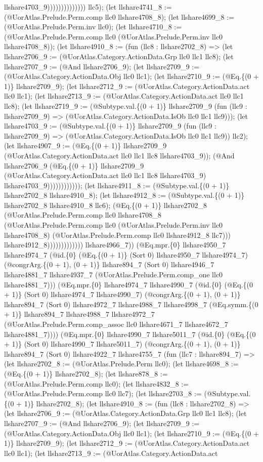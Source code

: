 \documentclass[11pt]{article}
\begin{document}
llshare4703\_9)))))))))))))) llc5); (let llshare4741\_8 := (@UorAtlas.Prelude.Perm.comp llc0 llshare4708\_8); (let llshare4699\_8 := (@UorAtlas.Prelude.Perm.inv llc0); (let llshare4710\_8 := (@UorAtlas.Prelude.Perm.comp llc0 (@UorAtlas.Prelude.Perm.inv llc0 llshare4708\_8)); (let llshare4910\_8 := (fun (llc8 : llshare2702\_8) => (let llshare2706\_9 := (@UorAtlas.Category.ActionData.Grp llc0 llc1 llc8); (let llshare2707\_9 := (@And llshare2706\_9); (let llshare2709\_9 := (@UorAtlas.Category.ActionData.Obj llc0 llc1); (let llshare2710\_9 := (@Eq.\{(0 + 1)\} llshare2709\_9); (let llshare2712\_9 := (@UorAtlas.Category.ActionData.act llc0 llc1); (let llshare2713\_9 := (@UorAtlas.Category.ActionData.act llc0 llc1 llc8); (let llshare2719\_9 := (@Subtype.val.\{(0 + 1)\} llshare2709\_9 (fun (llc9 : llshare2709\_9) => (@UorAtlas.Category.ActionData.IsOb llc0 llc1 llc9))); (let llshare4703\_9 := (@Subtype.val.\{(0 + 1)\} llshare2709\_9 (fun (llc9 : llshare2709\_9) => (@UorAtlas.Category.ActionData.IsOb llc0 llc1 llc9)) llc2); (let llshare4907\_9 := (@Eq.\{(0 + 1)\} llshare2709\_9 (@UorAtlas.Category.ActionData.act llc0 llc1 llc8 llshare4703\_9)); (@And llshare2706\_9 (@Eq.\{(0 + 1)\} llshare2709\_9 (@UorAtlas.Category.ActionData.act llc0 llc1 llc8 llshare4703\_9) llshare4703\_9)))))))))))); (let llshare4911\_8 := (@Subtype.val.\{(0 + 1)\} llshare2702\_8 llshare4910\_8); (let llshare4912\_8 := (@Subtype.val.\{(0 + 1)\} llshare2702\_8 llshare4910\_8 llc6); (@Eq.\{(0 + 1)\} llshare2702\_8 (@UorAtlas.Prelude.Perm.comp llc0 llshare4708\_8 (@UorAtlas.Prelude.Perm.comp llc0 (@UorAtlas.Prelude.Perm.inv llc0 llshare4708\_8) (@UorAtlas.Prelude.Perm.comp llc0 llshare4912\_8 llc7))) llshare4912\_8))))))))))))) llshare4966\_7)) (@Eq.mpr.\{0\} llshare4950\_7 llshare4974\_7 (@id.\{0\} (@Eq.\{(0 + 1)\} (Sort 0) llshare4950\_7 llshare4974\_7) (@congrArg.\{(0 + 1), (0 + 1)\} llshare894\_7 (Sort 0) llshare4946\_7 llshare4881\_7 llshare4937\_7 (@UorAtlas.Prelude.Perm.comp\_one llc0 llshare4881\_7))) (@Eq.mpr.\{0\} llshare4974\_7 llshare4990\_7 (@id.\{0\} (@Eq.\{(0 + 1)\} (Sort 0) llshare4974\_7 llshare4990\_7) (@congrArg.\{(0 + 1), (0 + 1)\} llshare894\_7 (Sort 0) llshare4972\_7 llshare4988\_7 llshare4998\_7 (@Eq.symm.\{(0 + 1)\} llshare894\_7 llshare4988\_7 llshare4972\_7 (@UorAtlas.Prelude.Perm.comp\_assoc llc0 llshare4671\_7 llshare4672\_7 llshare4881\_7)))) (@Eq.mpr.\{0\} llshare4990\_7 llshare5011\_7 (@id.\{0\} (@Eq.\{(0 + 1)\} (Sort 0) llshare4990\_7 llshare5011\_7) (@congrArg.\{(0 + 1), (0 + 1)\} llshare894\_7 (Sort 0) llshare4922\_7 llshare4755\_7 (fun (llc7 : llshare894\_7) => (let llshare2702\_8 := (@UorAtlas.Prelude.Perm llc0); (let llshare4698\_8 := (@Eq.\{(0 + 1)\} llshare2702\_8); (let llshare878\_8 := (@UorAtlas.Prelude.Perm.comp llc0); (let llshare4832\_8 := (@UorAtlas.Prelude.Perm.comp llc0 llc7); (let llshare2703\_8 := (@Subtype.val.\{(0 + 1)\} llshare2702\_8); (let llshare4910\_8 := (fun (llc8 : llshare2702\_8) => (let llshare2706\_9 := (@UorAtlas.Category.ActionData.Grp llc0 llc1 llc8); (let llshare2707\_9 := (@And llshare2706\_9); (let llshare2709\_9 := (@UorAtlas.Category.ActionData.Obj llc0 llc1); (let llshare2710\_9 := (@Eq.\{(0 + 1)\} llshare2709\_9); (let llshare2712\_9 := (@UorAtlas.Category.ActionData.act llc0 llc1); (let llshare2713\_9 := (@UorAtlas.Category.ActionData.act 
\end{document}
